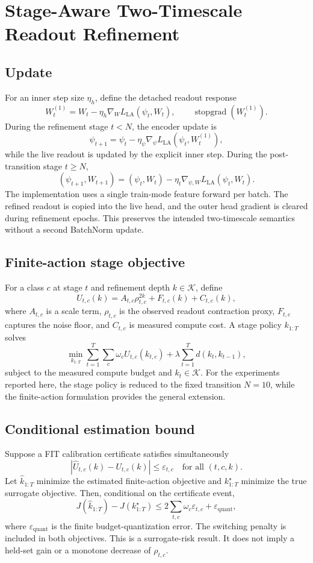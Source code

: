 \documentclass[10pt,letterpaper]{article}
\begin{document}
\section{Stage-Aware Two-Timescale Readout Refinement}
\subsection{Update}
For an inner step size $\eta_h$, define the detached readout response
\[
 W_t^{(1)}
 =
 W_t-\eta_h\nabla_W L_{\mathrm{LA}}(\psi_t,W_t),
 \qquad
 \operatorname{stopgrad}(W_t^{(1)}).
\]
During the refinement stage $t<N$, the encoder update is
\[
 \psi_{t+1}
 =
 \psi_t-\eta_\psi
 \nabla_\psi L_{\mathrm{LA}}(\psi_t,W_t^{(1)}),
\]
while the live readout is updated by the explicit inner step. During the post-transition stage $t\ge N$,
\[
(\psi_{t+1},W_{t+1})
=
(\psi_t,W_t)
-\eta_t\nabla_{\psi,W}L_{\mathrm{LA}}(\psi_t,W_t).
\]
The implementation uses a single train-mode feature forward per batch. The refined readout is copied into the live head, and the outer head gradient is cleared during refinement epochs. This preserves the intended two-timescale semantics without a second BatchNorm update.

\subsection{Finite-action stage objective}
For a class $c$ at stage $t$ and refinement depth $k\in\mathcal K$, define
\[
 U_{t,c}(k)
 =
 A_{t,c}\rho_{t,c}^{2k}
 +F_{t,c}(k)+C_{t,c}(k),
\]
where $A_{t,c}$ is a scale term, $\rho_{t,c}$ is the observed readout contraction proxy, $F_{t,c}$ captures the noise floor, and $C_{t,c}$ is measured compute cost. A stage policy $k_{1:T}$ solves
\[
\min_{k_{1:T}}
 \sum_{t=1}^{T}\sum_c\omega_c U_{t,c}(k_{t,c})
 +\lambda\sum_{t=1}^{T}d(k_t,k_{t-1}),
\]
subject to the measured compute budget and $k_t\in\mathcal K$. For the experiments reported here, the stage policy is reduced to the fixed transition $N=10$, while the finite-action formulation provides the general extension.

\subsection{Conditional estimation bound}
Suppose a FIT calibration certificate satisfies simultaneously
\[
|\widehat U_{t,c}(k)-U_{t,c}(k)|
\le \varepsilon_{t,c}
\quad\text{for all }(t,c,k).
\]
Let $\widehat{k}_{1:T}$ minimize the estimated finite-action objective and $k^\star_{1:T}$ minimize the true surrogate objective. Then, conditional on the certificate event,
\[
 J(\widehat{k}_{1:T})-J(k^\star_{1:T})
 \le
 2\sum_{t,c}\omega_c\varepsilon_{t,c}
 +\varepsilon_{\mathrm{quant}},
\]
where $\varepsilon_{\mathrm{quant}}$ is the finite budget-quantization error. The switching penalty is included in both objectives. This is a surrogate-risk result. It does not imply a held-set gain or a monotone decrease of $\rho_{t,c}$.
\end{document}
